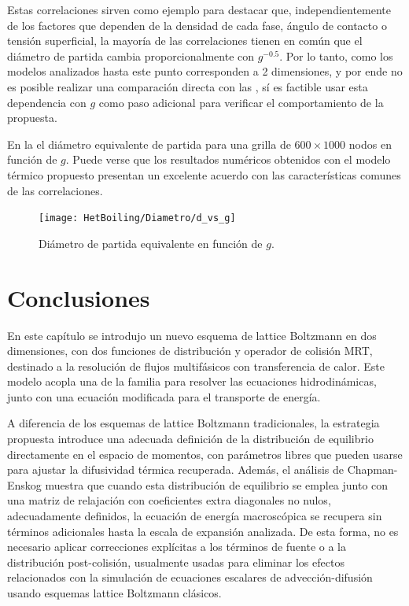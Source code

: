 Estas correlaciones sirven como ejemplo para destacar que, independientemente de los factores que dependen de la densidad de cada fase, \'angulo de contacto o tensi\'on superficial, la mayor\'ia de las correlaciones tienen en com\'un que el di\'ametro de partida cambia proporcionalmente con $g^{-0.5}$. Por lo tanto, como los modelos analizados hasta este punto corresponden a 2 dimensiones, y por ende no es posible realizar una comparaci\'on directa con las , s\'i es factible usar esta dependencia con $g$ como paso adicional para verificar el comportamiento de la \lbe{} propuesta.

En la  el di\'ametro equivalente de partida para una grilla de $600\times 1000$ nodos en funci\'on de $g$. Puede verse que los resultados num\'ericos obtenidos con el modelo t\'ermico propuesto presentan un excelente acuerdo con las caracter\'isticas comunes de las correlaciones.

\begin{figure}[ht]
	\centering
	\texttt{[image: HetBoiling/Diametro/d\_vs\_g]}
	\caption{Di\'ametro de partida equivalente en funci\'on de $g$.}
	\label{fig:dvsg_2d}
\end{figure}








\section{Conclusiones}

En este cap\'itulo se introdujo un nuevo esquema de lattice Boltzmann en dos dimensiones, con dos funciones de distribuci\'on y operador de colisi\'on MRT, destinado a la resoluci\'on de flujos multif\'asicos con transferencia de calor. Este modelo acopla una \lbe{} de la familia \pp{} para resolver las ecuaciones hidrodin\'amicas, junto con una ecuaci\'on modificada para el transporte de energ\'ia.

A diferencia de los esquemas de lattice Boltzmann tradicionales, la estrategia propuesta introduce una adecuada definici\'on de la distribuci\'on de equilibrio directamente en el espacio de momentos, con par\'ametros libres que pueden usarse para ajustar la difusividad t\'ermica recuperada. Adem\'as, el an\'alisis de Chapman-Enskog muestra que cuando esta distribuci\'on de equilibrio se emplea junto con una matriz de relajaci\'on con coeficientes extra diagonales no nulos, adecuadamente definidos, la ecuaci\'on de energ\'ia macrosc\'opica se recupera sin t\'erminos adicionales hasta la escala de expansi\'on analizada. De esta forma, no es necesario aplicar correcciones expl\'icitas a los t\'erminos de fuente o a la distribuci\'on post-colisi\'on, usualmente usadas para eliminar los efectos relacionados con la simulaci\'on de ecuaciones escalares de advecci\'on-difusi\'on usando esquemas lattice Boltzmann cl\'asicos.

